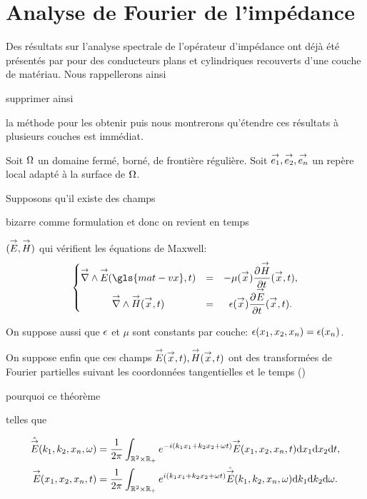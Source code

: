 \section{Analyse de Fourier de l'impédance}

Des résultats sur l'analyse spectrale de l'opérateur d'impédance ont déjà été présentés par \cite{hoppe_impedance_1995} pour des conducteurs plans et cylindriques recouverts d'une couche de matériau.
Nous rappellerons ainsi
\begin{REM}
  supprimer ainsi
\end{REM} la méthode pour les obtenir puis nous montrerons qu’étendre ces résultats à plusieurs couches est immédiat. 

Soit \(\Omega\) un domaine fermé, borné, de frontière régulière. Soit \({\overset{\rightarrow}{e_1}},{\overset{\rightarrow}{e_2}},{\overset{\rightarrow}{e_n}}\) un repère local adapté à la surface de \(\Omega\).

Supposons qu'il existe des champs
\begin{REM}
  bizarre comme formulation et donc on revient en temps
\end{REM} \(({\overset{\rightarrow}{E}},{\overset{\rightarrow}{H}})\) qui vérifient les équations de Maxwell:
\begin{equation*}
    \left\lbrace
    \begin{matrix}
    \vrot \vE(\gls{mat-vx},t) &=& -\mu(\vx) \ddr{t}{\vect H}(\vx,t),
    \\
    \vrot \vect H(\vx,t) &=& \eps(\vx) \ddr{t}{\vE}(\vx,t).
    \end{matrix}
    \right.
\end{equation*}

On suppose aussi que \(\epsilon\) et \(\mu\) sont constants par couche: \(\epsilon(x_1,x_2,x_n)=\epsilon(x_n)\).

On suppose enfin que ces champs \({\overset{\rightarrow}{E}}({\overset{\rightarrow}{x}},t),{\overset{\rightarrow}{H}}({\overset{\rightarrow}{x}},t)\) ont des transformées de Fourier partielles suivant les coordonnées tangentielles et le temps
(\cite[Théorème de Plancherel, p.~153]{yosida_functional_1995})
\begin{REM}
  pourquoi ce théorème
\end{REM} telles que

\begin{align*}
    \hat{{\overset{\rightarrow}{E}}} (k_1,k_2,x_n,\omega) &= \dfrac{1}{2\pi}\int_{\mathbb R^2\times\mathbb R_+} e^{-i(k_1x_1+k_2x_2+\omega t)}{\overset{\rightarrow}{E}}(x_1,x_2,x_n,t) \mathrm{d}{x_1}\mathrm{d}{x_2}\mathrm{d}{t},
    \\
    {\overset{\rightarrow}{E}}(x_1,x_2,x_n,t) &= \dfrac{1}{2\pi}\int_{\mathbb R^2\times\mathbb R_+} e^{i(k_1x_1+k_2x_2+\omega t)}\hat{{\overset{\rightarrow}{E}}} (k_1,k_2,x_n,\omega) \mathrm{d}{k_1}\mathrm{d}{k_2} \mathrm{d}{\omega}.
\end{align*}

